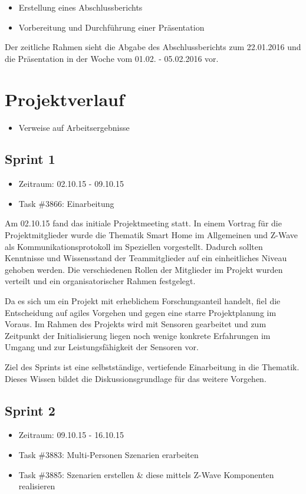 \documentclass[12pt, oneside, smallheadings]{scrbook}
\begin{document}
\begin{itemize}
\item Erstellung eines Abschlussberichts
\item Vorbereitung und Durchführung einer Präsentation\\
\end{itemize}
\noindent
Der zeitliche Rahmen sieht die Abgabe des Abschlussberichts zum 22.01.2016 und die Präsentation in der Woche vom 01.02. - 05.02.2016 vor.

\chapter{Projektverlauf}
\begin{itemize}
	\item Verweise auf Arbeitsergebnisse
\end{itemize}

\section{Sprint 1}
\begin{itemize}
	\item Zeitraum: 02.10.15 - 09.10.15
	\item Task \#3866: Einarbeitung
\end{itemize}
Am 02.10.15 fand das initiale Projektmeeting statt. In einem Vortrag für die Projektmitglieder wurde die Thematik Smart Home im Allgemeinen und Z-Wave als Kommunikationsprotokoll im Speziellen vorgestellt. Dadurch sollten Kenntnisse und Wissensstand der Teammitglieder auf ein einheitliches Niveau gehoben werden. Die verschiedenen Rollen der Mitglieder im Projekt wurden verteilt und ein organisatorischer Rahmen festgelegt.

Da es sich um ein Projekt mit erheblichem Forschungsanteil handelt, fiel die Entscheidung auf agiles Vorgehen und gegen eine starre Projektplanung im Voraus. Im Rahmen des Projekts wird mit Sensoren gearbeitet und zum Zeitpunkt der Initialisierung liegen noch wenige konkrete Erfahrungen im Umgang und zur Leistungsfähigkeit der Sensoren vor.

Ziel des Sprints ist eine selbstständige, vertiefende Einarbeitung in die Thematik. Dieses Wissen bildet die Diskussionsgrundlage für das weitere Vorgehen.

\section{Sprint 2}
\begin{itemize}
	\item Zeitraum: 09.10.15 - 16.10.15
	\item Task \#3883: Multi-Personen Szenarien erarbeiten
	\item Task \#3885: Szenarien erstellen \& diese mittels Z-Wave Komponenten realisieren
\end{itemize}
\end{document}

